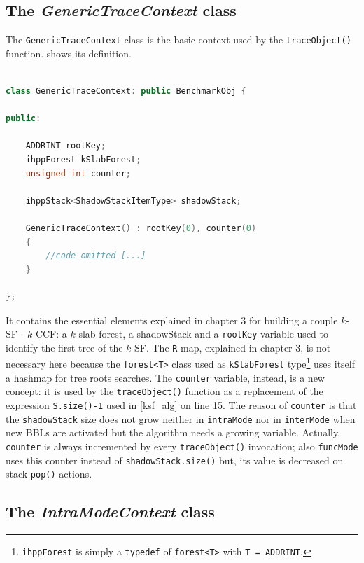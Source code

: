 \documentclass[a4paper,10pt]{report}
\begin{document}
\subsection{The \emph{GenericTraceContext} class}

The \verb|GenericTraceContext| class is the basic context used 
by the \verb|traceObject()| function.  shows its definition.

\begin{lstlisting}[language=C++, 
	caption={partial definition of \texttt{GenericTraceContext}}, 
	label=genericCtx, frame=leftline]

class GenericTraceContext: public BenchmarkObj {

public:

	ADDRINT rootKey;
	ihppForest kSlabForest;
	unsigned int counter;

	ihppStack<ShadowStackItemType> shadowStack;

	GenericTraceContext() : rootKey(0), counter(0) 
	{ 
		//code omitted [...]
	}

};

\end{lstlisting}

\noindent
It contains the essential elements explained in chapter 3 for building 
a couple $k$-SF - $k$-CCF: a $k$-slab forest, a shadowStack and a \verb|rootKey| variable used to identify the first tree of the $k$-SF. 
The \verb|R| map, explained in chapter 3, is not necessary here because the \verb|forest<T>| class used as \verb|kSlabForest| type\footnote{\texttt{ihppForest} is simply a \texttt{typedef} of \texttt{forest<T>} with \texttt{T = ADDRINT}.} uses itself 
a hashmap for tree roots searches. The \verb|counter| variable, instead, is a new concept:
it is used by the \verb|traceObject()| function as a replacement of the 
expression \verb|S.size()-1| used in \cref{ksf_alg} on line 15. 
The reason of \verb|counter| is that the \verb|shadowStack| size does not grow 
neither in \verb|intraMode| nor in \verb|interMode| when new BBLs are activated but
the algorithm needs a growing variable. Actually, \verb|counter| is always incremented
by every \verb|traceObject()| invocation; also \verb|funcMode| uses this counter
instead of \verb|shadowStack.size()| but, its value is decreased on stack \verb|pop()| actions.

\subsection{The \emph{IntraModeContext} class}
\end{document}
